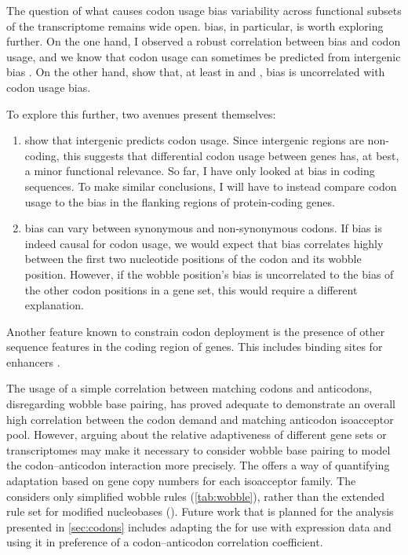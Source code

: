 The question of what causes codon usage bias variability across functional
subsets of the transcriptome remains wide open. \gc bias, in particular, is
worth exploring further. On the one hand, I observed a robust correlation
between \gc bias and codon usage, and we know that codon usage can sometimes be
predicted from intergenic \gc bias \citep{Chen:2004}. On the other hand,
\citet{Duret:2002} show that, at least in  and , \gc
bias is uncorrelated with codon usage bias.

To explore this further, two avenues present themselves:

\begin{enumerate}
    \item \citet{Chen:2004} show that intergenic \gc predicts codon usage. Since
        intergenic regions are non-coding, this suggests that differential codon
        usage between genes has, at best, a minor functional relevance. So far,
        I have only looked at \gc bias in coding sequences. To make similar
        conclusions, I will have to instead compare codon usage to the \gc bias
        in the flanking regions of protein-coding genes.
    \item \gc bias can vary between synonymous and non-synonymous codons. If \gc
        bias is indeed causal for codon usage, we would expect that \gc bias
        correlates highly between the first two nucleotide positions of the
        codon and its wobble position. However, if the wobble position’s \gc
        bias is uncorrelated to the \gc bias of the other codon positions in a
        gene set, this would require a different explanation.
\end{enumerate}

Another feature known to constrain codon deployment is the presence of other
sequence features in the coding region of genes. This includes binding sites for
enhancers \citep{Blencowe:2000}.


The usage of a simple correlation between matching codons and anticodons,
disregarding wobble base pairing, has proved adequate to demonstrate an overall
high correlation between the codon demand and matching \trna anticodon
isoacceptor pool. However, arguing about the relative adaptiveness of different
gene sets or transcriptomes may make it  necessary to consider wobble base
pairing to model the codon--anticodon interaction more precisely. The \tai
\citep{Dos_Reis:2003} offers a way of quantifying \trna adaptation based on
\trna gene copy numbers for each isoacceptor family. The \tai considers only
simplified wobble rules (\cref{tab:wobble}), rather than the extended rule set
for modified nucleobases (\citep{Murphy:2004}). Future work that is planned for
the analysis presented in \cref{sec:codons} includes adapting the \tai for use
with \trna expression data and using it in preference of a codon--anticodon
correlation coefficient.

